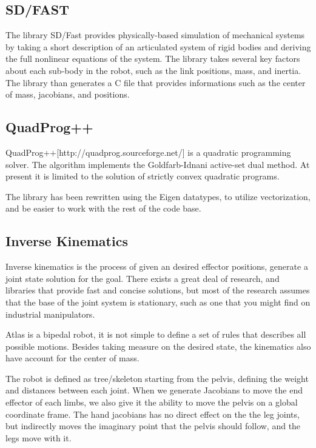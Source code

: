 \documentclass[12pt]{report}
\begin{document}
\subsection{SD/FAST}
The library SD/Fast provides physically-based simulation of mechanical systems by taking a short description of an articulated system of rigid bodies and deriving the full nonlinear equations of the system. \cite{sdfast} The library takes several key factors about each sub-body in the robot, such as the link positions, mass, and inertia. The library than generates a C file that provides informations such as the center of mass, jacobians, and positions. 

\subsection{QuadProg++}
QuadProg++[http://quadprog.sourceforge.net/] is a quadratic programming solver. The algorithm implements the Goldfarb-Idnani active-set dual method. At present it is limited to the solution of strictly convex quadratic programs. \cite{quadprog}

The library has been rewritten using the Eigen datatypes, to utilize vectorization, and be easier to work with the rest of the code base. 



\subsection{Inverse Kinematics}


Inverse kinematics is the process of given an desired effector positions, generate a joint state solution for the goal. There exists a great deal of research, and libraries that provide fast and concise solutions, but most of the research assumes that the base of the joint system is stationary, such as one that you might find on industrial manipulators. 

Atlas is a bipedal robot, it is not simple to define a set of rules that describes all possible motions. Besides taking measure on the desired state, the kinematics also have account for the center of mass.

The robot is defined as tree/skeleton starting from the pelvis, defining the weight and distances between each joint. When we generate Jacobians to move the end effector of each limbs, we also give it the ability to move the pelvis on a global coordinate frame. The hand jacobians has no direct effect on the the leg joints, but indirectly moves the imaginary point that the pelvis should follow, and the legs move with it. 
\end{document}

